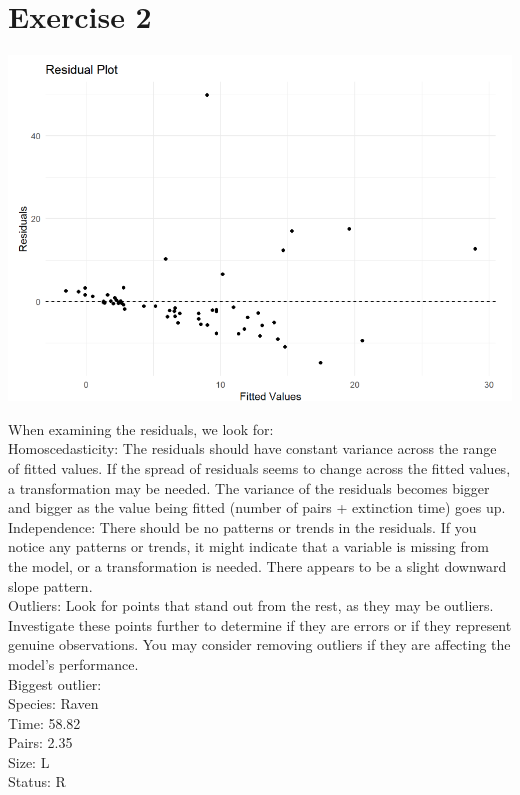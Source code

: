 \documentclass{article}
\begin{document}
\section{Exercise 2}

\begin{center}
\includegraphics[scale=0.5]{graphs/residual.png}
\end{center}


When examining the residuals, we look for: \\

Homoscedasticity: The residuals should have constant variance across the range of fitted values. If the spread of residuals seems to change across the fitted values, a transformation may be needed.
The variance of the residuals becomes bigger and bigger as the value being fitted (number of pairs + extinction time) goes up. \\

Independence: There should be no patterns or trends in the residuals. If you notice any patterns or trends, it might indicate that a variable is missing from the model, or a transformation is needed.
There appears to be a slight downward slope pattern. \\

Outliers: Look for points that stand out from the rest, as they may be outliers. Investigate these points further to determine if they are errors or if they represent genuine observations. You may consider removing outliers if they are affecting the model’s performance. \\
Biggest outlier: \\
Species: Raven \\
Time: 58.82 \\
Pairs: 2.35 \\
Size: L \\
Status: R \\
\end{document}
